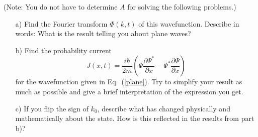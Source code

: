 \documentclass[11pt]{article}
\begin{document}
\begin{itemize}
(Note: You do not have to determine $A$ for solving the following problems.)
\begin{itemize}
\item[a)]
Find the Fourier transform $\Phi(k,t)$ of this wavefunction. Describe in
words: What is the result telling you about plane waves?
\item[b)]
Find the probability current
\begin{displaymath}
J(x,t) = \frac{i\hbar}{2m}\left(\Psi\frac{\partial \Psi^*}{\partial x}
-\Psi^*\frac{\partial\Psi}{\partial x}\right)
\end{displaymath}
for the wavefunction given in Eq.\ (\ref{plane}).
Try to simplify your result as much as
possible and give a brief interpretation of the expression you get.
\item[c)] If you flip the sign of $k_0$, describe what has changed physically
and mathematically about the state. How is this reflected in the results
from part b)?
\end{itemize}
%
\end{itemize}
%
\end{document}
